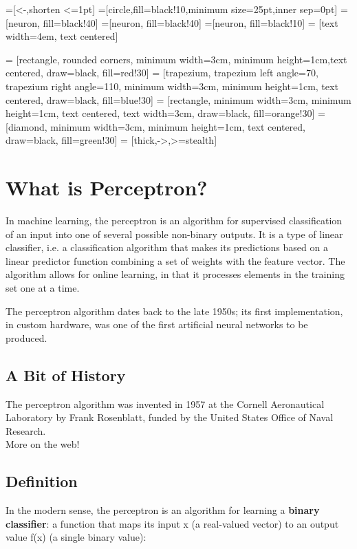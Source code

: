 \documentclass[12pt, right open]{memoir}
\begin{document}
=[<-,shorten <=1pt]
=[circle,fill=black!10,minimum size=25pt,inner sep=0pt]
=[neuron, fill=black!40]
=[neuron, fill=black!40]
=[neuron, fill=black!10]
 = [text width=4em, text centered]

 = [rectangle, rounded corners, minimum width=3cm, minimum height=1cm,text centered, draw=black, fill=red!30]
 = [trapezium, trapezium left angle=70, trapezium right angle=110, minimum width=3cm, minimum height=1cm, text centered, draw=black, fill=blue!30]
 = [rectangle, minimum width=3cm, minimum height=1cm, text centered, text width=3cm, draw=black, fill=orange!30]
 = [diamond, minimum width=3cm, minimum height=1cm, text centered, draw=black, fill=green!30]
 = [thick,->,>=stealth]


\tableofcontents


\chapter{What is Perceptron?}
In machine learning, the perceptron is an algorithm for supervised classification of an input into one of several possible non-binary outputs. It is a type of linear classifier, i.e. a classification algorithm that makes its predictions based on a linear predictor function combining a set of weights with the feature vector. The algorithm allows for online learning, in that it processes elements in the training set one at a time.

The perceptron algorithm dates back to the late 1950s; its first implementation, in custom hardware, was one of the first artificial neural networks to be produced.

\section{A Bit of History}
The perceptron algorithm was invented in 1957 at the Cornell Aeronautical Laboratory by Frank Rosenblatt, funded by the United States Office of Naval Research. \hfill \\

More on the web!

\section{Definition}
In the modern sense, the perceptron is an algorithm for learning a \textbf{binary classifier}: a function that maps its input x (a real-valued vector) to an output value f(x) (a single binary value):
\end{document}

